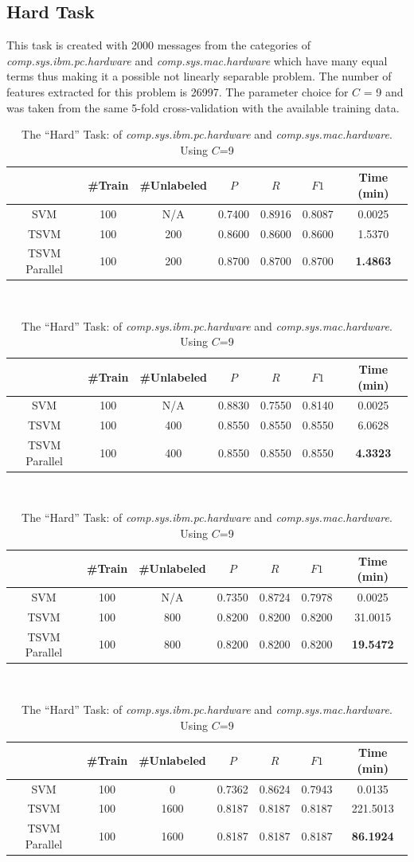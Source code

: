 \subsection{Hard Task}

This  task is created with 2000 messages from the categories of \emph{comp.sys.ibm.pc.hardware}
and\emph{ comp.sys.mac.hardware} which have many equal terms thus
making it a possible not linearly separable problem. The number of
features extracted for this problem is 26997. The parameter choice
for $C$ = 9 and was taken from the same 5-fold cross-validation with
the available training data.

%
\begin{table}
\begin{longtable}
\begin{tabular}{|c|c|c|c|c|c||c|}
\hline
 & \#Train & \#Unlabeled & $P$  & $R$  & $F1$  & Time (min)\tabularnewline
\hline 
SVM & 100 & N/A & 0.7400 & 0.8916 & 0.8087 & 0.0025\tabularnewline
\hline 
TSVM & 100 & 200 & 0.8600 & 0.8600 & 0.8600 & 1.5370\tabularnewline
\hline 
TSVM Parallel & 100 & 200 & 0.8700 & 0.8700 & 0.8700 & \textbf{1.4863}\tabularnewline
\hline
\end{tabular} \\
\tabularnewline
\tabularnewline
\begin{tabular}{|c|c|c|c|c|c||c|}
\hline 
 & \#Train & \#Unlabeled & $P$  & $R$  & $F1$  & Time (min)\tabularnewline
\hline 
SVM & 100 & N/A & 0.8830 & 0.7550 & 0.8140 & 0.0025\tabularnewline
\hline 
TSVM & 100 & 400 & 0.8550 & 0.8550 & 0.8550 & 6.0628\tabularnewline
\hline 
TSVM Parallel & 100 & 400 & 0.8550 & 0.8550 & 0.8550 & \textbf{4.3323}\tabularnewline
\hline
\end{tabular} \\
\tabularnewline
\tabularnewline
\begin{tabular}{|c|c|c|c|c|c||c|}
\hline 
 & \#Train & \#Unlabeled & $P$  & $R$  & $F1$  & Time (min)\tabularnewline
\hline
\hline 
SVM & 100 & N/A & 0.7350 & 0.8724 & 0.7978 & 0.0025\tabularnewline
\hline 
TSVM & 100 & 800 & 0.8200 & 0.8200 & 0.8200 & 31.0015\tabularnewline
\hline 
TSVM Parallel & 100 & 800 & 0.8200 & 0.8200 & 0.8200 & \textbf{19.5472}\tabularnewline
\hline
\end{tabular} \\
\tabularnewline
\tabularnewline
\begin{tabular}{|c|c|c|c|c|c||c|}
\hline 
 & \#Train & \#Unlabeled & $P$  & $R$  & $F1$  & Time (min)\tabularnewline
\hline
\hline 
SVM & 100 & 0 & 0.7362 & 0.8624 & 0.7943 & 0.0135\tabularnewline
\hline 
TSVM & 100 & 1600 & 0.8187 & 0.8187 & 0.8187 & 221.5013\tabularnewline
\hline 
TSVM Parallel & 100 & 1600 & 0.8187 & 0.8187 & 0.8187 & \textbf{86.1924}\tabularnewline
\hline
\end{tabular}\tabularnewline
\tabularnewline
\tabularnewline
\tabularnewline
\end{longtable}

\caption{The {}``Hard'' Task:\emph{ }of \emph{comp.sys.ibm.pc.hardware} and\emph{
comp.sys.mac.hardware}. Using $C$=9 \label{tab:Hard-Task:comp.graphics-and} }

\end{table}

